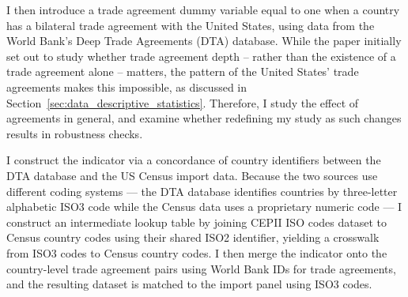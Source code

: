 I then introduce a trade agreement dummy variable equal to one when a country has a bilateral trade agreement with the United States, using data from the World Bank's Deep Trade Agreements (DTA) database. While the paper initially set out to study whether trade agreement depth -- rather than the existence of a trade agreement alone -- matters, the pattern of the United States' trade agreements makes this impossible, as discussed in Section~\ref{sec:data_descriptive_statistics}. Therefore, I study the effect of agreements in general, and examine whether redefining my study as such changes results in robustness checks. 

I construct the indicator via a concordance of country identifiers between the DTA database and the US Census import data. Because the two sources use different coding systems — the DTA database identifies countries by three-letter alphabetic ISO3 code while the Census data uses a proprietary numeric code — I construct an intermediate lookup table by joining CEPII ISO codes dataset to Census country codes using their shared ISO2 identifier, yielding a crosswalk from ISO3 codes to Census country codes. I then merge the indicator onto the country-level trade agreement pairs using World Bank IDs for trade agreements, and the resulting dataset is matched to the import panel using ISO3 codes.


